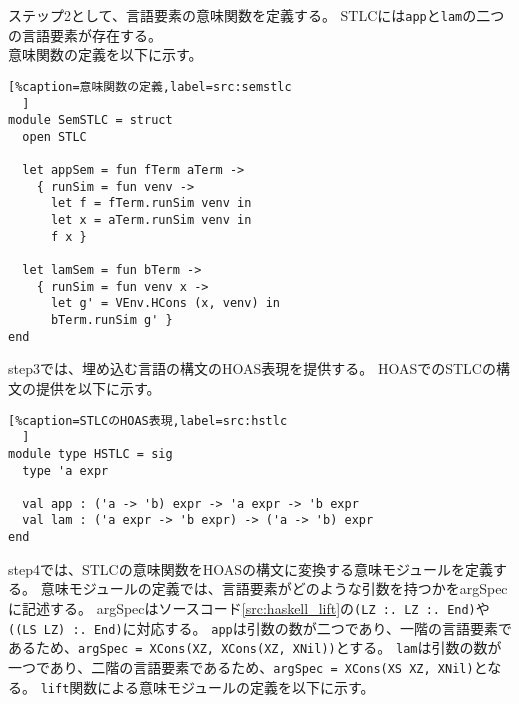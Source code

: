 \documentclass[uplatex]{sumiilab-paper}
\theoremstyle{mystyle}
\numberwithin{definition}{chapter} %
\begin{document}
ステップ2として、言語要素の意味関数を定義する。
STLCには{\tt app}と{\tt lam}の二つの言語要素が存在する。\\
意味関数の定義を以下に示す。

\begin{lstlisting}[%caption=意味関数の定義,label=src:semstlc
  ]
module SemSTLC = struct
  open STLC
  
  let appSem = fun fTerm aTerm ->
    { runSim = fun venv -> 
      let f = fTerm.runSim venv in
      let x = aTerm.runSim venv in
      f x }
  
  let lamSem = fun bTerm ->
    { runSim = fun venv x ->
      let g' = VEnv.HCons (x, venv) in 
      bTerm.runSim g' }    
end
\end{lstlisting}

step3では、埋め込む言語の構文のHOAS表現を提供する。
HOASでのSTLCの構文の提供を以下に示す。

\begin{lstlisting}[%caption=STLCのHOAS表現,label=src:hstlc
  ]
module type HSTLC = sig
  type 'a expr 

  val app : ('a -> 'b) expr -> 'a expr -> 'b expr
  val lam : ('a expr -> 'b expr) -> ('a -> 'b) expr
end
\end{lstlisting}

step4では、STLCの意味関数をHOASの構文に変換する意味モジュールを定義する。
意味モジュールの定義では、言語要素がどのような引数を持つかをargSpecに記述する。
argSpecはソースコード\ref{src:haskell_lift}の{\tt (LZ :. LZ :. End)}や{\tt ((LS LZ) :. End)}に対応する。
{\tt app}は引数の数が二つであり、一階の言語要素であるため、{\tt argSpec = XCons(XZ, XCons(XZ, XNil))}とする。
{\tt lam}は引数の数が一つであり、二階の言語要素であるため、{\tt argSpec = XCons(XS XZ, XNil)}となる。
{\tt lift}関数による意味モジュールの定義を以下に示す。
\end{document}

